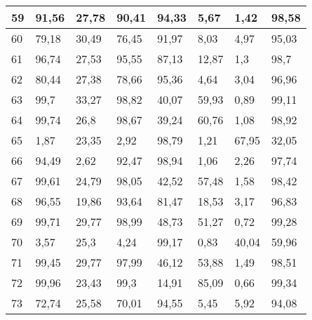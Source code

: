 \begin{longtable}[c]{|l|l|l|l|l|l|l|l|}
59              & 91,56        & 27,78        & 90,41       & 94,33         & 5,67          & 1,42          & 98,58         \\ \hline
60              & 79,18        & 30,49        & 76,45       & 91,97         & 8,03          & 4,97          & 95,03         \\ \hline
61              & 96,74        & 27,53        & 95,55       & 87,13         & 12,87         & 1,3           & 98,7          \\ \hline
62              & 80,44        & 27,38        & 78,66       & 95,36         & 4,64          & 3,04          & 96,96         \\ \hline
63              & 99,7         & 33,27        & 98,82       & 40,07         & 59,93         & 0,89          & 99,11         \\ \hline
64              & 99,74        & 26,8         & 98,67       & 39,24         & 60,76         & 1,08          & 98,92         \\ \hline
65              & 1,87         & 23,35        & 2,92        & 98,79         & 1,21          & 67,95         & 32,05         \\ \hline
66              & 94,49        & 2,62         & 92,47       & 98,94         & 1,06          & 2,26          & 97,74         \\ \hline
67              & 99,61        & 24,79        & 98,05       & 42,52         & 57,48         & 1,58          & 98,42         \\ \hline
68              & 96,55        & 19,86        & 93,64       & 81,47         & 18,53         & 3,17          & 96,83         \\ \hline
69              & 99,71        & 29,77        & 98,99       & 48,73         & 51,27         & 0,72          & 99,28         \\ \hline
70              & 3,57         & 25,3         & 4,24        & 99,17         & 0,83          & 40,04         & 59,96         \\ \hline
71              & 99,45        & 29,77        & 97,99       & 46,12         & 53,88         & 1,49          & 98,51         \\ \hline
72              & 99,96        & 23,43        & 99,3        & 14,91         & 85,09         & 0,66          & 99,34         \\ \hline
73              & 72,74        & 25,58        & 70,01       & 94,55         & 5,45          & 5,92          & 94,08         \\ \hline

\end{longtable}
